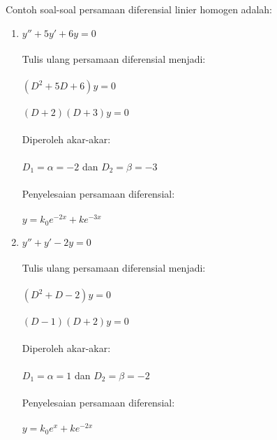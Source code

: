 Contoh soal-soal persamaan diferensial linier homogen adalah:

\begin{enumerate}[1.]

	\item \begin{math} y'' + 5y' + 6y = 0 \end{math} \\ \\
	Tulis ulang persamaan diferensial menjadi: \\ \\
	\begin{math} (D^{2} + 5D + 6)y = 0 \end{math} \\ \\
	\begin{math} (D + 2) (D + 3)y = 0 \end{math} \\ \\
	Diperoleh akar-akar: \\ \\
	\begin{math} D_1 = \alpha = -2 \end{math} dan \begin{math} D_2 = \beta = -3 \end{math} \\ \\
	Penyelesaian persamaan diferensial: \\ \\
	\begin{math} y = k_0 e^{-2x} + ke^{-3x} \end{math}

	\item \begin{math} y'' + y' - 2y = 0 \end{math} \\ \\
	Tulis ulang persamaan diferensial menjadi: \\ \\
	\begin{math} (D^{2} + D - 2)y = 0 \end{math} \\ \\
	\begin{math} (D - 1) (D + 2)y = 0 \end{math} \\ \\
	Diperoleh akar-akar: \\ \\
	\begin{math} D_1 = \alpha = 1 \end{math} dan \begin{math} D_2 = \beta = -2 \end{math} \\ \\
	Penyelesaian persamaan diferensial: \\ \\
	\begin{math} y = k_0 e^{x} + ke^{-2x} \end{math}


\end{enumerate}
